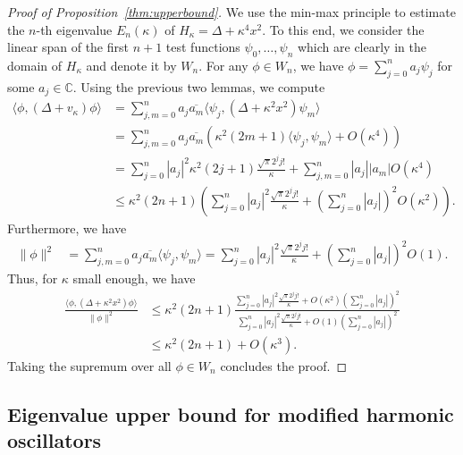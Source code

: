 \documentclass[12pt, reqno]{amsart}
\theoremstyle{definition}
\numberwithin{equation}{section}
\newcommand{\C}{{\mathbb C}}
\begin{document}
\begin{proof}[Proof of Proposition~\ref{thm:upperbound}]
   We use the min-max principle to estimate the $n$-th eigenvalue $E_n(\kappa)$ of $H_\kappa=\Delta + \kappa^4 x^2$. To this end, we consider the linear span of the first $n+1$ test functions $\psi_0,\ldots,\psi_n$ which are clearly in the domain of $H_\kappa$ and denote it by $W_n$. For any $\phi\in W_n$, we have $\phi=\sum_{j=0}^n a_j \psi_j$ for some $a_j\in \C$. Using the previous two lemmas, we compute
 \begin{align*}
     \langle \phi, (\Delta + v_\kappa)\phi\rangle &= \sum_{j,m=0}^n a_j \overline{a_m} \langle \psi_j, (\Delta + \kappa^2 x^2)\psi_m\rangle \\
     &= \sum_{j,m=0}^n a_j \overline{a_m} \left(  \kappa^2 (2m+1)  \langle \psi_j,\psi_m\rangle + O(\kappa^4)  \right)\\
     &= \sum_{j=0}^n |a_j|^2  \kappa^2 (2j+1)  \frac{\sqrt{\pi}2^jj!}{\kappa} +  \sum_{j,m=0}^n |a_j|| a_m| O(\kappa^4)\\
     &\leq   \kappa^2 (2n+1) \left( \sum_{j=0}^n |a_j|^2   \frac{\sqrt{\pi}2^jj!}{\kappa} +  \left(\sum_{j=0}^n |a_j|\right)^2 O(\kappa^2)\right).
 \end{align*}
 Furthermore, we have
 \begin{align*}
     \|\phi\|^2 &= \sum_{j,m=0}^n a_j \overline{a_m}  \langle \psi_j,\psi_m\rangle =  \sum_{j=0}^n |a_j|^2  \frac{\sqrt{\pi}2^jj!}{\kappa} +  \left(\sum_{j=0}^n |a_j|\right)^2O(1) .
 \end{align*}   
 Thus, for $\kappa$ small enough, we have
 \begin{align*}
     \frac{\langle \phi, (\Delta + \kappa^2 x^2)\phi\rangle}{\|\phi\|^2} &\leq \kappa^2 (2n+1) \frac{  \sum_{j=0}^n |a_j|^2   \frac{\sqrt{\pi}2^jj!}{\kappa} + O(\kappa^2)  \left(\sum_{j=0}^n |a_j|\right)^2}{  \sum_{j=0}^n |a_j|^2  \frac{\sqrt{\pi}2^jj!}{\kappa} + O(1)  \left(\sum_{j=0}^n |a_j|\right)^2} \\
     &\leq \kappa^2 (2n+1) + O(\kappa^3).
 \end{align*}
 Taking the supremum over all $\phi\in W_n$ %
 concludes the proof.    
\end{proof}



\subsection{Eigenvalue upper bound for modified harmonic oscillators}
\end{document}
